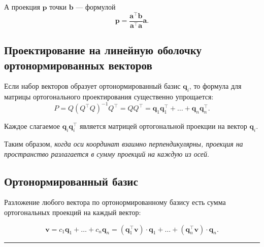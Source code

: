 \documentclass[11pt,a4paper]{article}
\renewcommand{\linethickness}{0.1ex}
\begin{document}
А проекция \(\mathbf{p}\) точки \(\mathbf{b}\) --- формулой
\[ \mathbf{p} = \frac{\mathbf{a^\top} \mathbf{b}}{\mathbf{a^\top}\mathbf{a}}\mathbf{a}. \]

    \hypertarget{ux43fux440ux43eux435ux43aux442ux438ux440ux43eux432ux430ux43dux438ux435-ux43dux430-ux43bux438ux43dux435ux439ux43dux443ux44e-ux43eux431ux43eux43bux43eux447ux43aux443-ux43eux440ux442ux43eux43dux43eux440ux43cux438ux440ux43eux432ux430ux43dux43dux44bux445-ux432ux435ux43aux442ux43eux440ux43eux432}{%
\subsection{Проектирование на линейную оболочку ортонормированных
векторов}\label{ux43fux440ux43eux435ux43aux442ux438ux440ux43eux432ux430ux43dux438ux435-ux43dux430-ux43bux438ux43dux435ux439ux43dux443ux44e-ux43eux431ux43eux43bux43eux447ux43aux443-ux43eux440ux442ux43eux43dux43eux440ux43cux438ux440ux43eux432ux430ux43dux43dux44bux445-ux432ux435ux43aux442ux43eux440ux43eux432}}

Если набор векторов образует ортонормированный базис \(\mathbf{q}_i\),
то формула для матрицы ортогонального проектирования существенно
упрощается: \[
  P = Q (Q^\top Q)^{-1} Q^\top = QQ^\top = \mathbf{q}_1 \mathbf{q}_1^\top + \ldots + \mathbf{q}_n \mathbf{q}_n^\top.
\]

Каждое слагаемое \(\mathbf{q}_i \mathbf{q}_i^\top\) является матрицей
ортогональной проекции на вектор \(\mathbf{q}_i\).

Таким образом, \emph{когда оси координат взаимно перпендикулярны,
проекция на пространство разлагается в сумму проекций на каждую из
осей}.

    \hypertarget{ux43eux440ux442ux43eux43dux43eux440ux43cux438ux440ux43eux432ux430ux43dux43dux44bux439-ux431ux430ux437ux438ux441}{%
\subsection{Ортонормированный
базис}\label{ux43eux440ux442ux43eux43dux43eux440ux43cux438ux440ux43eux432ux430ux43dux43dux44bux439-ux431ux430ux437ux438ux441}}

Разложение любого вектора по ортонормированному базису есть сумма
ортогональных проекций на каждый вектор:

\[
  \mathbf{v} = c_1 \mathbf{q}_1 + \ldots + c_n \mathbf{q}_n = (\mathbf{q}_1^\top \mathbf{v}) \cdot \mathbf{q}_1 + \ldots + (\mathbf{q}_n^\top \mathbf{v}) \cdot \mathbf{q}_n.
\]

    \begin{center}\rule{0.5\linewidth}{\linethickness}\end{center}
\end{document}
